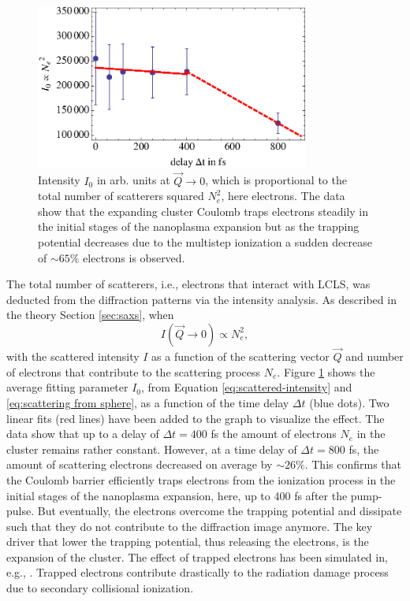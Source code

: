 \begin{figure}
	\centering
		\includegraphics[width=0.80\textwidth]{images/results/number-of-scatterer.eps}
	\caption[Time-resoved behavior of number of scatterers due to nanoplasma expansion]{Intensity $I_{0}$ in arb. units at $\vec{Q}\rightarrow 0$, which is proportional to the total number of scatterers squared $N_{e}^{2}$, here electrons. The data show that the expanding cluster Coulomb traps electrons steadily in the initial stages of the nanoplasma expansion but as the trapping potential decreases due to the multistep ionization a sudden decrease of $\sim 65\%$ electrons is observed.}
	\label{fig:number-of-scatterer}
\end{figure}
The total number of scatterers, i.e., electrons that interact with LCLS, was deducted from the diffraction patterns via the intensity analysis. As described in the theory Section \ref{sec:saxs}, when
\begin{equation}
I\left(\vec{Q}\rightarrow 0\right)\propto N_{e}^{2},
\label{eq:}
\end{equation}
with the scattered intensity $I$ as a function of the scattering vector $\vec{Q}$ and number of electrons that contribute to the scattering process $N_{e}$. Figure \ref{fig:number-of-scatterer} shows the average fitting parameter $I_{0}$, from Equation \eqref{eq:scattered-intensity} and \eqref{eq:scattering from sphere}, as a function of the time delay $\Delta t$ (blue dots). Two linear fits (red lines) have been added to the graph to visualize the effect. The data show that up to a delay of $\Delta t=400$ fs the amount of electrons $N_{e}$ in the cluster remains rather constant. However, at a time delay of $\Delta t=800$ fs, the amount of scattering electrons decreased on average by $\sim 26 \%$. This confirms that the Coulomb barrier efficiently traps electrons from the ionization process in the initial stages of the nanoplasma expansion, here, up to 400 fs after the pump-pulse. But eventually, the electrons overcome the trapping potential and dissipate such that they do not contribute to the diffraction image anymore. The key driver that lower the trapping potential, thus releasing the electrons, is the expansion of the cluster. The effect of trapped electrons has been simulated in, e.g., \citep{Hau-Riege-2004-PRE}. Trapped electrons contribute drastically to the radiation damage process due to secondary collisional ionization.\\
